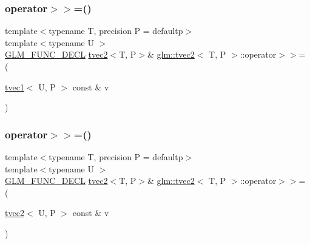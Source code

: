 \mbox{\label{structglm_1_1tvec2_a44b9f53542701ce37c0806bc29a7c89c}} 
\subsubsection{\texorpdfstring{operator$>$$>$=()}{operator>>=()}\hspace{0.1cm}{\footnotesize\ttfamily [2/6]}}
{\footnotesize\ttfamily template$<$typename T, precision P = defaultp$>$ \\
template$<$typename U $>$ \\
\mbox{\hyperlink{setup_8hpp_ab2d052de21a70539923e9bcbf6e83a51}{G\+L\+M\+\_\+\+F\+U\+N\+C\+\_\+\+D\+E\+CL}} \mbox{\hyperlink{structglm_1_1tvec2}{tvec2}}$<$T, P$>$\& \mbox{\hyperlink{structglm_1_1tvec2}{glm\+::tvec2}}$<$ T, P $>$\+::operator$>$$>$= (\begin{DoxyParamCaption}\item[{\mbox{\hyperlink{structglm_1_1tvec1}{tvec1}}$<$ U, P $>$ const \&}]{v }\end{DoxyParamCaption})}

\mbox{\label{structglm_1_1tvec2_aea51b73efe332b3fae252644ea44dc43}} 
\subsubsection{\texorpdfstring{operator$>$$>$=()}{operator>>=()}\hspace{0.1cm}{\footnotesize\ttfamily [3/6]}}
{\footnotesize\ttfamily template$<$typename T, precision P = defaultp$>$ \\
template$<$typename U $>$ \\
\mbox{\hyperlink{setup_8hpp_ab2d052de21a70539923e9bcbf6e83a51}{G\+L\+M\+\_\+\+F\+U\+N\+C\+\_\+\+D\+E\+CL}} \mbox{\hyperlink{structglm_1_1tvec2}{tvec2}}$<$T, P$>$\& \mbox{\hyperlink{structglm_1_1tvec2}{glm\+::tvec2}}$<$ T, P $>$\+::operator$>$$>$= (\begin{DoxyParamCaption}\item[{\mbox{\hyperlink{structglm_1_1tvec2}{tvec2}}$<$ U, P $>$ const \&}]{v }\end{DoxyParamCaption})}


